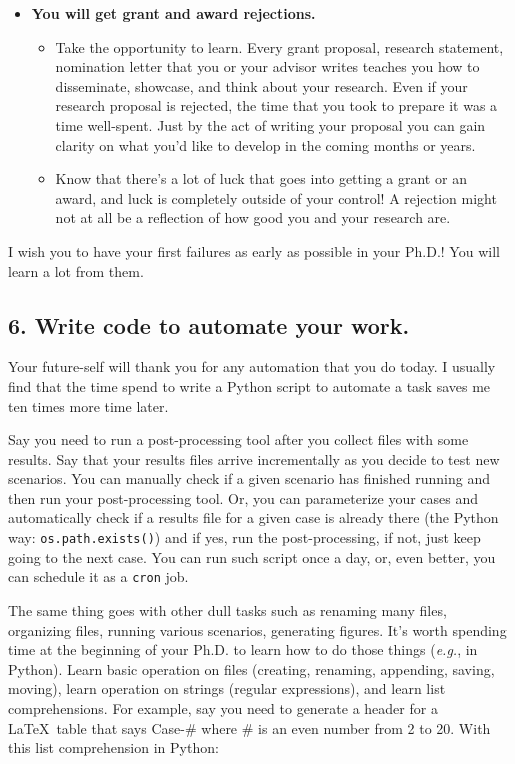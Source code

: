 \documentclass[10pt,twocolumn]{article}
\begin{document}
\begin{itemize}
\item \textbf{You will get grant and award rejections.}

\begin{itemize}
\item Take the opportunity to learn. Every grant proposal, research statement, nomination letter that you or your advisor writes teaches you how to disseminate, showcase, and think about your research. Even if your research proposal is rejected, the time that you took to prepare it was a time well-spent. Just by the act of writing your proposal you can gain clarity on what you’d like to develop in the coming months or years.
\item Know that there’s a lot of luck that goes into getting a grant or an award, and luck is completely outside of your control! A rejection might not at all be a reflection of how good you and your research are.
\end{itemize}
\end{itemize}

I wish you to have your first failures as early as possible in your Ph.D.! You will learn a lot from them.

\subsection*{6. Write code to automate your work.}

Your future-self will thank you for any automation that you do today. I usually find that the time spend to write a Python script to automate a task saves me ten times more time later.

Say you need to run a post-processing tool after you collect files with some results. Say that your results files arrive incrementally as you decide to test new scenarios. You can manually check if a given scenario has finished running and then run your post-processing tool. Or, you can parameterize your cases and automatically check if a results file for a given case is already there (the Python way: \texttt{os.path.exists()}) and if yes, run the post-processing, if not, just keep going to the next case. You can run such script once a day, or, even better, you can schedule it as a \texttt{cron} job.

The same thing goes with other dull tasks such as renaming many files, organizing files, running various scenarios, generating figures. It’s worth spending time at the beginning of your Ph.D. to learn how to do those things (\textit{e.g.}, in Python). Learn basic operation on files (creating, renaming, appending, saving, moving), learn operation on strings (regular expressions), and learn list comprehensions. For example, say you need to generate a header for a \LaTeX\  table that says Case-\# where \# is an even number from 2 to 20. With this list comprehension in Python:
\end{document}
